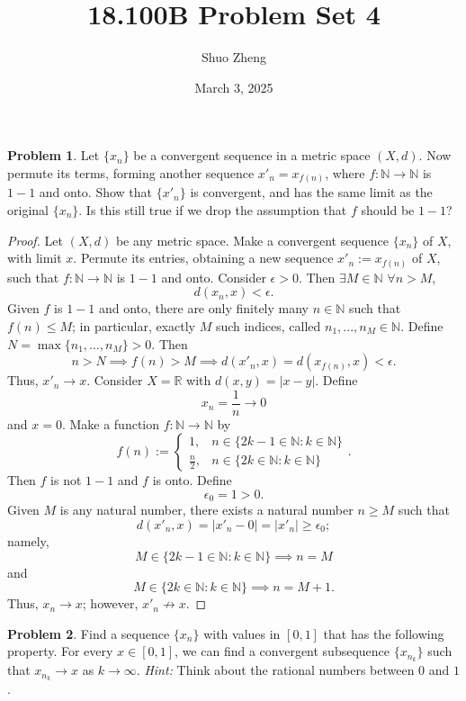 \documentclass{amsart}
\title{18.100B Problem Set 4}
\author{Shuo Zheng}
\date{March 3, 2025}
\theoremstyle{definition}
\newtheorem{problem}{Problem}
\begin{document}
\maketitle

\begin{problem}
    Let $\{x_n\}$ be a convergent sequence in a metric space $(X,d)$. Now permute its terms, forming another sequence $x'_n = x_{f(n)}$, where $f : \mathbb{N} \to \mathbb{N}$ is $1-1$ and onto. Show that $\{x'_n\}$ is convergent, and has the same limit as the original $\{x_n\}$. Is this still true if we drop the assumption that $f$ should be $1-1$?
\end{problem}

\begin{proof}
    Let $(X,d)$ be any metric space. Make a convergent sequence $\{x_n\}$ of $X$, with limit $x$. Permute its entries, obtaining a new sequence $x'_n := x_{f(n)}$ of $X$, such that $f: \mathbb{N} \to \mathbb{N}$ is $1-1$ and onto. Consider $\epsilon > 0$. Then $\exists M \in \mathbb{N}$ $\forall n > M$, 
    \[
    d(x_n,x) < \epsilon.
    \]
    Given $f$ is $1-1$ and onto, there are only finitely many $n \in \mathbb{N}$ such that $f(n) \leq M$; in particular, exactly $M$ such indices, called $n_1,...,n_M \in \mathbb{N}$. Define $N = \max\{n_1,...,n_M\} > 0$. Then
    \[
    n > N \implies f(n) > M \implies d(x'_n,x) = d(x_{f(n)},x) < \epsilon.
    \]
    Thus, $x'_n \to x$. Consider $X = \mathbb{R}$ with $d(x,y) = \vert x - y \vert$. Define
    \[
    x_n = \frac{1}{n} \to 0
    \]
    and $x = 0$. Make a function $f: \mathbb{N} \to \mathbb{N}$ by
    \[
    f(n) := \begin{cases} 
        1, & n \in \{2k-1 \in \mathbb{N} : k \in \mathbb{N}\} \\
        \frac{n}{2}, & n \in \{2k \in \mathbb{N} : k \in \mathbb{N}\}
    \end{cases}.
    \]
    Then $f$ is not $1-1$ and $f$ is onto. Define 
    \[
    \epsilon_0 = 1 > 0.
    \]
    Given $M$ is any natural number, there exists a natural number $n \geq M$ such that 
    \[
    d(x'_n,x) = \vert x'_n - 0 \vert = \vert x'_n \vert \geq \epsilon_0;
    \]
    namely, 
    \[
    M \in \{2k-1 \in \mathbb{N} : k \in \mathbb{N}\} \implies n = M
    \]
    and 
    \[
    M \in \{2k \in \mathbb{N} : k \in \mathbb{N}\} \implies n = M + 1.
    \]
    Thus, $x_n \to x$; however, $x'_n \not \to x$. 
\end{proof}

\begin{problem}
    Find a sequence $\{x_n\}$ with values in $[0,1]$ that has the following property. For every $x \in [0,1]$, we can find a convergent subsequence $\{x_{n_k}\}$ such that $x_{n_k} \to x$ as $k \to \infty$. \textit{Hint:} Think about the rational numbers between $0$ and $1$.
\end{problem}
\end{document}
